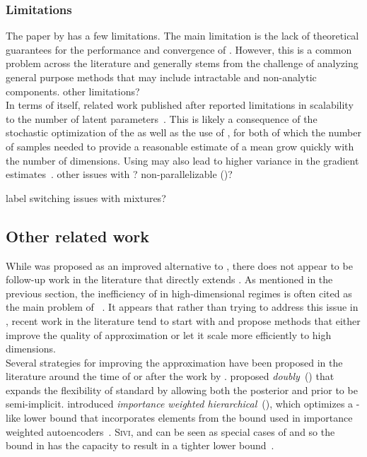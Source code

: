 \documentclass[10pt]{article}
\begin{document}
\subsubsection{Limitations}

The paper by \citet{Titsias:2019} has a few limitations. The main limitation is the lack of theoretical guarantees for the performance and convergence of \uivi. However, this is a common problem across the \vi literature and generally stems from the challenge of analyzing general purpose methods that may include intractable and non-analytic components. \todo other limitations?
\\

In terms of \uivi itself, related work published after \uivi reported limitations in scalability to the number of latent parameters~\citep{Molchanova:2019,Moens:2021}. This is likely a consequence of the stochastic optimization of the \elbo as well as the use of \mcmc, for both of which the number of samples needed to provide a reasonable estimate of a mean grow quickly with the number of dimensions. Using \mcmc may also lead to higher variance in the \elbo gradient estimates~\citep{Betancourt:2015}. \todo other issues with \mcmc? non-parallelizable (\citep{Sobolev:2019})?

\todo label switching issues with mixtures?


\subsection{Other related work} \label{an:postpaper}

While \uivi was proposed as an improved alternative to \sivi, there does not appear to be follow-up work in the literature that directly extends \uivi. As mentioned in the previous section, the inefficiency of \mcmc in high-dimensional regimes is often cited as the main problem of \uivi~\citep{Molchanova:2019,Moens:2021}. It appears that rather than trying to address this issue in \uivi, recent work in the literature tend to start with \sivi and propose methods that either improve the quality of approximation or let it scale more efficiently to high dimensions.
\\

Several strategies for improving the \sivi approximation have been proposed in the literature around the time of or after the work by \citet{Titsias:2019}. \citet{Molchanov:2019} proposed \textit{doubly}~\sivi (\dsivi) that expands the flexibility of standard \sivi by allowing both the posterior and prior to be semi-implicit. \citet{Sobolev:2019} introduced \textit{importance weighted hierarchical}~\vi (\iwhvi), which optimizes a \sivi-like lower bound that incorporates elements from the bound used in importance weighted autoencoders~\citep{Burda:2015}. \textsc{Sivi}, \dsivi and \hvm can be seen as special cases of \iwhvi and so the bound in \iwhvi has the capacity to result in a tighter lower bound~\citep{Sobolev:2019}.
\\
\end{document}

